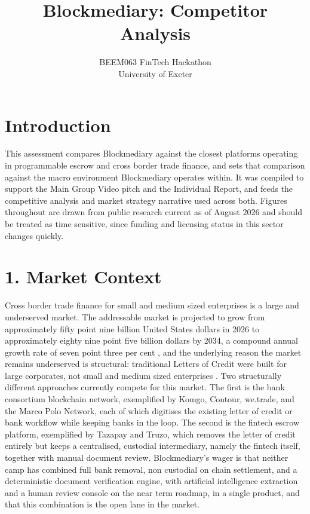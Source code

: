 \documentclass[12pt, a4paper]{article}
\title{\textbf{Blockmediary: Competitor Analysis}}
\author{}
\date{BEEM063 FinTech Hackathon \\ University of Exeter}
\begin{document}
\maketitle
\newpage

\section*{Introduction}

This assessment compares Blockmediary against the closest platforms operating in
programmable escrow and cross border trade finance, and sets that comparison against the
macro environment Blockmediary operates within. It was compiled to support the Main Group
Video pitch and the Individual Report, and feeds the competitive analysis and market
strategy narrative used across both. Figures throughout are drawn from public research
current as of August 2026 and should be treated as time sensitive, since funding and
licensing status in this sector changes quickly.

\section*{1. Market Context}

Cross border trade finance for small and medium sized enterprises is a large and
underserved market. The addressable market is projected to grow from approximately fifty
point nine billion United States dollars in 2026 to approximately eighty nine point five
billion dollars by 2034, a compound annual growth rate of seven point three per cent
\citep{marketsme2026}, and the underlying reason the market remains underserved is
structural: traditional Letters of Credit were built for large corporates, not small and
medium sized enterprises \citep{weforum2025}. Two structurally different approaches
currently compete for this market. The first is the bank consortium blockchain network,
exemplified by Komgo, Contour, we.trade, and the Marco Polo Network, each of which
digitises the existing letter of credit or bank workflow while keeping banks in the loop.
The second is the fintech escrow platform, exemplified by Tazapay and Truzo, which removes
the letter of credit entirely but keeps a centralised, custodial intermediary, namely the
fintech itself, together with manual document review. Blockmediary's wager is that neither
camp has combined full bank removal, non custodial on chain settlement, and a deterministic
document verification engine, with artificial intelligence extraction and a human review
console on the near term roadmap, in a single product, and that this combination is the
open lane in the market.
\end{document}
